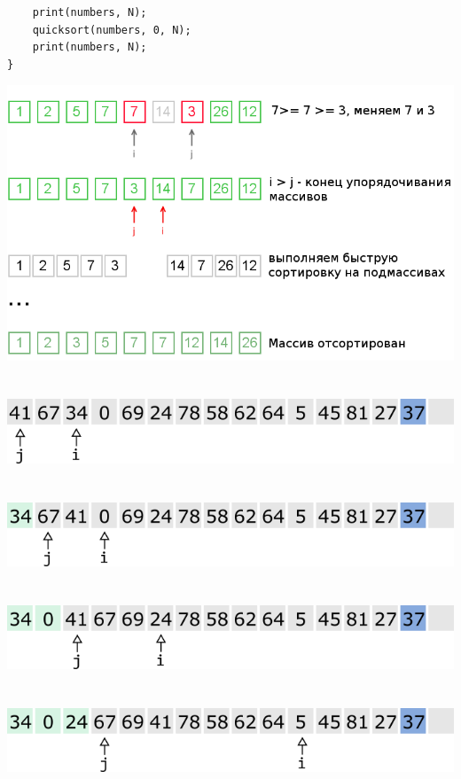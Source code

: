 \documentclass{article}
\begin{document}
\begin{multicols}{2}
\begin{lstlisting}
    print(numbers, N);
    quicksort(numbers, 0, N);
    print(numbers, N);
}
\end{lstlisting}
\vfill\null
\columnbreak
\includegraphics[scale=0.53]{../images/qs2.png}
\\
\\
\\
\includegraphics[scale=0.53]{../images/qs4.png}
\\
\\
\\
\includegraphics[scale=0.53]{../images/qs5.png}
\\
\\
\\
\includegraphics[scale=0.53]{../images/qs6.png}
\\
\\
\\
\includegraphics[scale=0.53]{../images/qs7.png}

\end{multicols}
\end{document}
